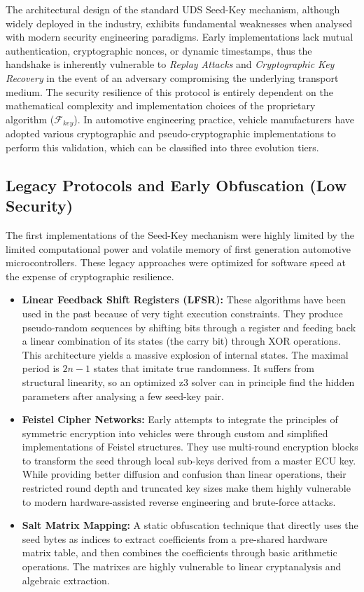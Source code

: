 The architectural design of the standard \gls{UDS} Seed-Key mechanism, although widely deployed in the industry, exhibits fundamental weaknesses when analysed with modern security engineering paradigms. Early implementations lack mutual authentication, cryptographic nonces, or dynamic timestamps, thus the handshake is inherently vulnerable to \textit{Replay Attacks} and \textit{Cryptographic Key Recovery} in the event of an adversary compromising the underlying transport medium. 
The security resilience of this protocol is entirely dependent on the mathematical complexity and implementation choices of the proprietary algorithm ($\mathcal{F}_{key}$). In automotive engineering practice, vehicle manufacturers have adopted various cryptographic and pseudo-cryptographic implementations to perform this validation, which can be classified into three evolution tiers.

\subsection[Legacy Protocols and Early Obfuscation]{Legacy Protocols and Early Obfuscation (Low Security)}
The first implementations of the Seed-Key mechanism were highly limited by the limited computational power and volatile memory of first generation automotive microcontrollers. These legacy approaches were optimized for software speed at the expense of cryptographic resilience.
\begin{itemize}
    \item \textbf{Linear Feedback Shift Registers (LFSR)\cite{UDS_SA_algorithms}:}  These algorithms have been used in the past because of very tight execution constraints. They produce pseudo-random sequences by shifting bits through a register and feeding back a linear combination of its states (the carry bit) through XOR operations. This architecture yields a massive explosion of internal states. The maximal period is $2n - 1$ states that imitate true randomness. It suffers from structural linearity, so an optimized z3 solver can in principle find the hidden parameters after analysing a few seed-key pair.
    \item \textbf{Feistel Cipher Networks:}  Early attempts to integrate the principles of symmetric encryption into vehicles were through custom and simplified implementations of Feistel structures. They use multi-round encryption blocks to transform the seed through local sub-keys derived from a master ECU key. While providing better diffusion and confusion than linear operations, their restricted round depth and truncated key sizes make them highly vulnerable to modern hardware-assisted reverse engineering and brute-force attacks.
    \item \textbf{Salt Matrix Mapping:} A static obfuscation technique that directly uses the seed bytes as indices to extract coefficients from a pre-shared hardware matrix table, and then combines the coefficients through basic arithmetic operations. The matrixes are highly vulnerable to linear cryptanalysis and algebraic extraction.
\end{itemize}


